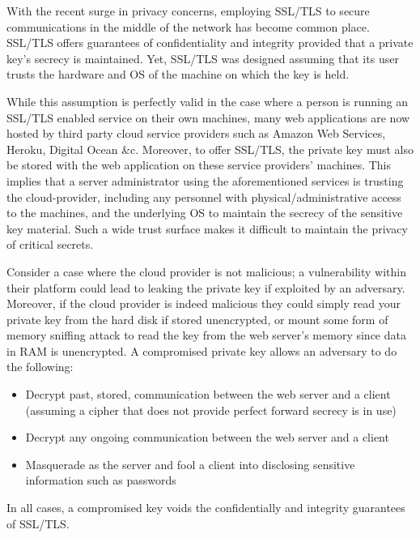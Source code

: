 \documentclass[../main.tex]{subfiles}
\begin{document}
With the recent surge in privacy concerns, employing SSL/TLS to secure communications in the middle of the network has become common place. 
SSL/TLS offers guarantees of confidentiality and integrity provided that a private key's secrecy is maintained. Yet, SSL/TLS was designed 
assuming that its user trusts the hardware and OS of the machine on which the key is held. 

While this assumption is perfectly valid in the case where a person is running an SSL/TLS enabled service on their own machines, many web
applications are now hosted by third party cloud service providers such as Amazon Web Services, Heroku, Digital Ocean \&c. Moreover, to offer 
SSL/TLS, the private key must also be stored with the web application on these service providers' machines. This implies that a server administrator 
using the aforementioned services is trusting the cloud-provider, including any personnel with physical/administrative access to the machines, and the underlying OS
to maintain the secrecy of the sensitive key material. Such a wide trust surface makes it difficult to maintain the privacy of critical
secrets.

Consider a case where the cloud provider is not malicious; a vulnerability within their platform could lead to leaking the private key
if exploited by an adversary. Moreover, if the cloud provider is indeed malicious they could simply read your private key from the hard disk if stored 
unencrypted, or mount some form of memory sniffing attack to read the key from the web server's memory since data in RAM is unencrypted. A compromised private 
key allows an adversary to do the following:
\begin{itemize}
	\item Decrypt past, stored, communication between the web server and a client (assuming a cipher that does not provide perfect forward secrecy is in use)
	\item Decrypt any ongoing communication between the web server and a client
	\item Masquerade as the server and fool a client into disclosing sensitive information such as passwords
\end{itemize}
In all cases, a compromised key voids the confidentially and integrity guarantees of SSL/TLS. 
\end{document}
